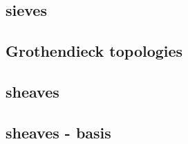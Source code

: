 \subsection{sieves}




\subsection{Grothendieck topologies}




\subsection{sheaves}







\subsection{sheaves - basis}



